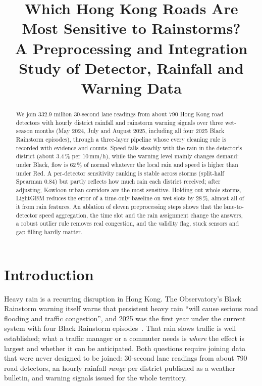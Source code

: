 \documentclass[conference]{IEEEtran}
\begin{document}
\title{Which Hong Kong Roads Are Most Sensitive to Rainstorms?\\
A Preprocessing and Integration Study of Detector, Rainfall and Warning Data}

\author{
\and
{}
\and
{}
}

\maketitle

\begin{abstract}
We join 332.9 million 30-second lane readings from about 790 Hong Kong road detectors with
hourly district rainfall and rainstorm warning signals over three wet-season months (May 2024,
July and August 2025, including all four 2025 Black Rainstorm episodes), through a three-layer
pipeline whose every cleaning rule is recorded with evidence and counts. Speed falls steadily
with the rain in the detector's district (about 3.4\,\% per 10\,mm/h), while the warning level
mainly changes demand: under Black, flow is 62\,\% of normal whatever the local rain and speed
is higher than under Red. A per-detector sensitivity ranking is stable across storms
(split-half Spearman 0.84) but partly reflects how much rain each district received; after
adjusting, Kowloon urban corridors are the most sensitive. Holding out whole storms, LightGBM
reduces the error of a time-only baseline on wet slots by 28\,\%, almost all of it from rain
features. An ablation of eleven preprocessing steps shows that the lane-to-detector speed
aggregation, the time slot and the rain assignment change the answers, a robust outlier rule
removes real congestion, and the validity flag, stuck sensors and gap filling hardly matter.
\end{abstract}

\section{Introduction}
Heavy rain is a recurring disruption in Hong Kong. The Observatory's Black Rainstorm
warning itself warns that persistent heavy rain ``will cause serious road flooding and traffic
congestion'', and 2025 was the first year under the current system with four Black Rainstorm
episodes~\cite{arxiv2025black}. That rain slows traffic is well established; what a traffic
manager or a commuter needs is \emph{where} the effect is largest and whether it can be
anticipated. Both questions require joining data that were never designed to be joined:
30-second lane readings from about 790 road detectors, an hourly rainfall \emph{range} per
district published as a weather bulletin, and warning signals issued for the whole territory.
\end{document}
